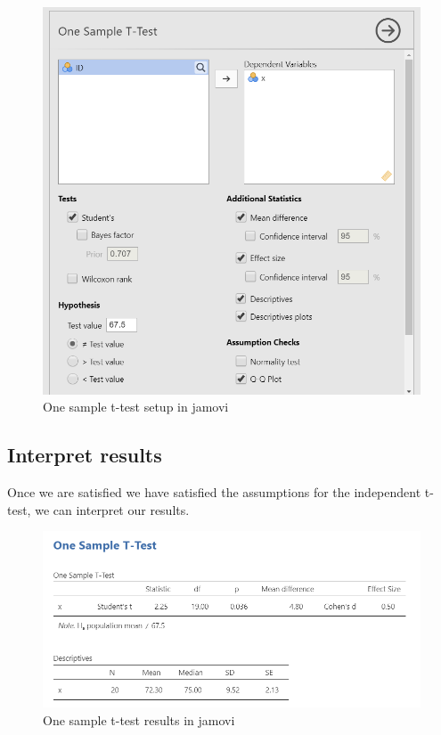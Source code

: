 \documentclass[
]{book}
\begin{document}
\begin{figure}

{\centering \includegraphics[width=0.8\linewidth]{images/07.1-one_sample_t-test/setup} 

}

\caption{One sample t-test setup in jamovi}\label{fig:unnamed-chunk-5}
\end{figure}

\hypertarget{interpret-results}{%
\subsection{Interpret results}\label{interpret-results}}

Once we are satisfied we have satisfied the assumptions for the independent t-test, we can interpret our results.

\begin{figure}

{\centering \includegraphics[width=1\linewidth]{images/07.1-one_sample_t-test/results} 

}

\caption{One sample t-test results in jamovi}\label{fig:unnamed-chunk-6}
\end{figure}
\end{document}
